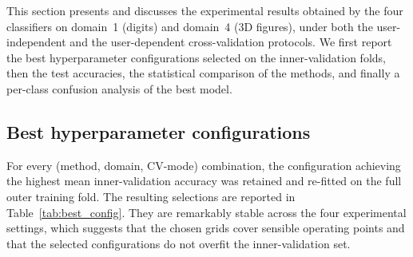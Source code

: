 
This section presents and discusses the experimental results obtained by the
four classifiers on domain~1 (digits) and domain~4 (3D figures), under both
the user-independent and the user-dependent cross-validation protocols.
We first report the best hyperparameter configurations selected on the
inner-validation folds, then the test accuracies, the statistical comparison
of the methods, and finally a per-class confusion analysis of the best model.

\subsection{Best hyperparameter configurations}
\label{subsec:best_config}

For every (method, domain, CV-mode) combination, the configuration achieving
the highest mean inner-validation accuracy was retained and re-fitted on the
full outer training fold. The resulting selections are reported in
Table~\ref{tab:best_config}. They are remarkably stable across the four
experimental settings, which suggests that the chosen grids cover sensible
operating points and that the selected configurations do not overfit the
inner-validation set.

